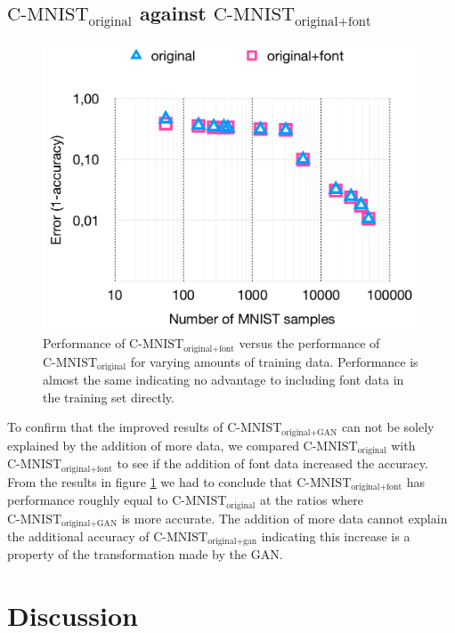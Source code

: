 \documentclass[10pt,twocolumn,letterpaper]{article}
\begin{document}
\subsection{$\text{C-MNIST}_\text{original}$ against $\text{C-MNIST}_\text{original+font}$}
\begin{figure}[h]
\begin{center}
	\includegraphics[width=0.9\linewidth]{../graph-font-original-comparison.png}
\end{center}
   \caption{Performance of $\text{C-MNIST}_\text{original+font}$ versus the performance of $\text{C-MNIST}_\text{original}$ for varying amounts of training data. Performance is almost the same indicating no advantage to including font data in the training set directly.}
\label{fig:graph-font-original-comparison}
\end{figure}

To confirm that the improved results of $\text{C-MNIST}_\text{original+GAN}$ can not be solely explained by the addition of more data, we compared $\text{C-MNIST}_\text{original}$ with $\text{C-MNIST}_\text{original+font}$ to see if the addition of font data increased the accuracy. From the results in figure \ref{fig:graph-font-original-comparison} we had to conclude that $\text{C-MNIST}_\text{original+font}$ has performance roughly equal to $\text{C-MNIST}_\text{original}$ at the ratios where $\text{C-MNIST}_\text{original+GAN}$ is more accurate. The addition of more data cannot explain the additional accuracy of $\text{C-MNIST}_\text{original+gan}$ indicating this increase is a property of the transformation made by the GAN.


\section{Discussion}
\end{document}
